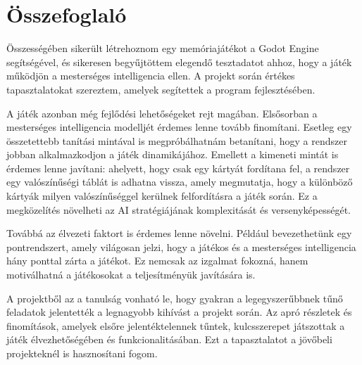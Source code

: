 \chapter{Összefoglaló}

\thispagestyle{fancy}
\pagestyle{fancy}

Összességében sikerült létrehoznom egy memóriajátékot a Godot Engine segítségével, és sikeresen begyűjtöttem elegendő tesztadatot ahhoz, hogy a játék működjön a mesterséges intelligencia ellen. A projekt során értékes tapasztalatokat szereztem, amelyek segítettek a program fejlesztésében.

A játék azonban még fejlődési lehetőségeket rejt magában. Elsősorban a mesterséges intelligencia modelljét érdemes lenne tovább finomítani. Esetleg egy összetettebb tanítási mintával is megpróbálhatnám betanítani, hogy a rendszer jobban alkalmazkodjon a játék dinamikájához. Emellett a kimeneti mintát is érdemes lenne javítani: ahelyett, hogy csak egy kártyát fordítana fel, a rendszer egy valószínűségi táblát is adhatna vissza, amely megmutatja, hogy a különböző kártyák milyen valószínűséggel kerülnek felfordításra a játék során. Ez a megközelítés növelheti az AI stratégiájának komplexitását és versenyképességét.

Továbbá az élvezeti faktort is érdemes lenne növelni. Például bevezethetünk egy pontrendszert, amely világosan jelzi, hogy a játékos és a mesterséges intelligencia hány ponttal zárta a játékot. Ez nemcsak az izgalmat fokozná, hanem motiválhatná a játékosokat a teljesítményük javítására is.

A projektből az a tanulság vonható le, hogy gyakran a legegyszerűbbnek tűnő feladatok jelentették a legnagyobb kihívást a projekt során. Az apró részletek és finomítások, amelyek elsőre jelentéktelennek tűntek, kulcsszerepet játszottak a játék élvezhetőségében és funkcionalitásában. Ezt a tapasztalatot a jövőbeli projekteknél is hasznosítani fogom.


